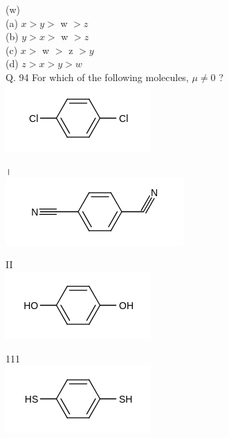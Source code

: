 \documentclass[10pt]{article}
\begin{document}
(w)\\
(a) $x>y>$ w $>z$\\
(b) $y>x>$ w $>z$\\
(c) $x>$ w $>$ z $>y$\\
(d) $z>x>y>w$\\
Q. 94 For which of the following molecules, $\mu \neq 0$ ?\\
\includegraphics{smile-50ba1b0fd66df17ac6f6c3df2d50450de58870d1}

।\\
\includegraphics{smile-2d28e8023446ed07b5d56b330e926ad8058915d7}

II\\
\includegraphics{smile-303f8cda6edef097fe3c70dcd8d3fc73004b992e}

111\\
\includegraphics{smile-1148ec04a0604b51993369cb7638de088a36e7da}
\end{document}
